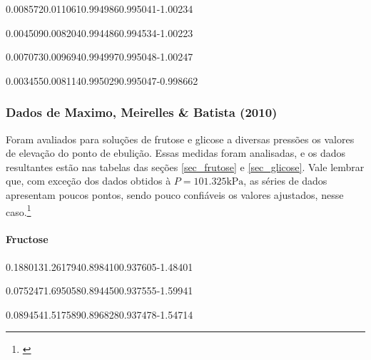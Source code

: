 %
	{0.008572}{0.011061}{0.994986}{0.995041}{-1.00234}

%
	{0.004509}{0.008204}{0.994486}{0.994534}{-1.00223}

%
	{0.007073}{0.009694}{0.994997}{0.995048}{-1.00247}

%
	{0.003455}{0.008114}{0.995029}{0.995047}{-0.998662}
\FloatBarrier

\subsubsection{Dados de Maximo, Meirelles \& Batista (2010)}

Foram avaliados para soluções de frutose e glicose a diversas pressões
os valores de elevação do ponto de ebulição. Essas medidas foram analisadas, e
os dados resultantes estão nas tabelas das seções \ref{sec_frutose} e
\ref{sec_glicose}. Vale lembrar que, com exceção dos dados obtidos à
$P=101.325\text{kPa}$, as séries de dados apresentam poucos pontos, sendo
pouco confiáveis os valores ajustados, nesse caso.\footnote{\cite{maximo2010}}

\paragraph{Fructose}
\label{sec_fructose}

%
	{0.188013}{1.261794}{0.898410}{0.937605}{-1.48401}

%
	{0.075247}{1.695058}{0.894450}{0.937555}{-1.59941}

%
	{0.089454}{1.517589}{0.896828}{0.937478}{-1.54714}

